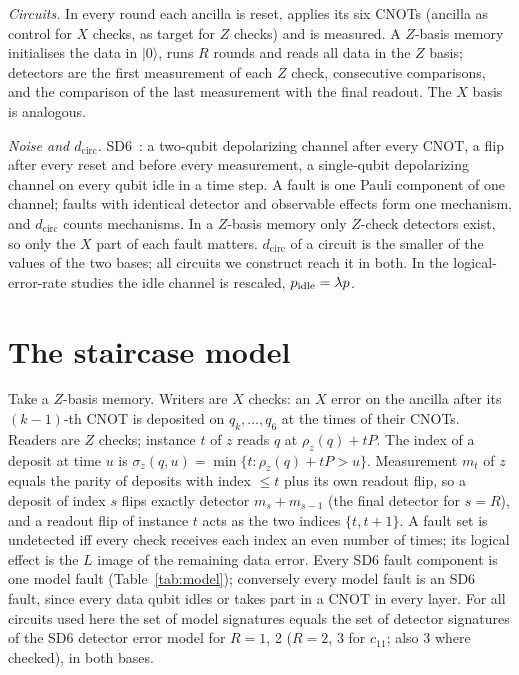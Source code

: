 \documentclass[aps,prl,twocolumn,superscriptaddress,nofootinbib]{revtex4-2}
\newcommand{\dcirc}{d_{\mathrm{circ}}}
\begin{document}
\emph{Circuits.} In every round each ancilla is reset, applies its six CNOTs (ancilla as
control for $X$ checks, as target for $Z$ checks) and is measured. A $Z$-basis memory
initialises the data in $|0\rangle$, runs $R$ rounds and reads all data in the $Z$ basis;
detectors are the first measurement of each $Z$ check, consecutive comparisons, and the
comparison of the last measurement with the final readout. The $X$ basis is analogous.

\emph{Noise and $\dcirc$.} SD6~\cite{Gidney2021honeycomb}: a two-qubit depolarizing channel
after every CNOT, a flip after every reset and before every measurement, a single-qubit
depolarizing channel on every qubit idle in a time step. A fault is one Pauli component of
one channel; faults with identical detector and observable effects form one mechanism, and
$\dcirc$ counts mechanisms. In a $Z$-basis memory only $Z$-check detectors exist, so only
the $X$ part of each fault matters. $\dcirc$ of a circuit is the smaller of the values of
the two bases; all circuits we construct reach it in both. In the logical-error-rate
studies the idle channel is rescaled, $p_{\rm idle}=\lambda p$.

\section{The staircase model}\label{sm:model}
Take a $Z$-basis memory. Writers are $X$ checks: an $X$ error on the ancilla after its
$(k-1)$-th CNOT is deposited on $q_k,\dots,q_6$ at the times of their CNOTs. Readers are $Z$
checks; instance $t$ of $z$ reads $q$ at $\rho_z(q)+tP$. The index of a deposit at time $u$
is $\sigma_z(q,u)=\min\{t:\rho_z(q)+tP>u\}$. Measurement $m_t$ of $z$ equals the parity of
deposits with index $\le t$ plus its own readout flip, so a deposit of index $s$ flips exactly
detector $m_s+m_{s-1}$ (the final detector for $s=R$), and a readout flip of instance $t$
acts as the two indices $\{t,t+1\}$. A fault set is undetected iff every check receives each
index an even number of times; its logical effect is the $L$ image of the remaining data
error. Every SD6 fault component is one model fault (Table~\ref{tab:model}); conversely every
model fault is an SD6 fault, since every data qubit idles or takes part in a CNOT in every
layer. For all circuits used here the set of model signatures equals the set of detector
signatures of the SD6 detector error model for $R=1$, 2 ($R=2$, 3 for $c_{11}$; also 3 where
checked), in both bases.
\end{document}
